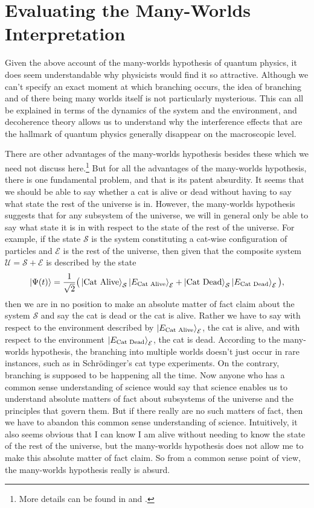  
    
    \section{Evaluating the Many-Worlds Interpretation}\label{manyworldsinterpretation2}
    Given the above account of the many-worlds hypothesis of quantum physics, it does seem understandable why physicists would find it so attractive. Although we can't specify an exact moment at which branching occurs, the idea of branching and of there being many worlds itself is not particularly mysterious. This can all be explained in terms of the dynamics of the system and the environment, and decoherence theory allows us to understand why the interference effects that are the hallmark of quantum physics generally disappear on the macroscopic level. 
    
    There are other advantages  of the many-worlds hypothesis besides these which we need not discuss here.\footnote{More details can be found in \cite{Schlosshauer} and \cite{joos2013decoherence}.} But for all the advantages of the many-worlds hypothesis, there is one fundamental problem, and that is its patent absurdity. It seems that we should be able to say whether a cat is alive or dead without having to say what state the rest of the universe is in. However, the many-worlds hypothesis suggests that for any subsystem of the universe, we will in general only be able to say what state it is in with respect to the state of the rest of the universe. For example, if the state $\mathcal{S}$ is the system constituting a cat-wise configuration of particles and $\mathcal{E}$ is the rest of the universe, then given that the composite system $\mathcal{U}=\mathcal{S}+\mathcal{E}$ is described by the state $$\ket{\Psi(t)}=\frac{1}{\sqrt{2}}\big(\ket{\text{Cat Alive}}_\mathcal{S}\ket{E_\text{Cat Alive}}_\mathcal{E}+\ket{\text{Cat Dead}}_\mathcal{S}\ket{E_\text{Cat Dead}}_\mathcal{E}\big),$$ then we are in no position to make an absolute matter of fact claim about the system $\mathcal{S}$ and say the cat is dead or the cat is alive. Rather we have to say with respect to the environment described by $\ket{E_\text{Cat Alive}}_\mathcal{E}$, the cat is alive, and with respect to the environment $\ket{E_\text{Cat Dead}}_\mathcal{E}$, the cat is dead. According to the many-worlds hypothesis, the branching into multiple worlds doesn't just occur in rare instances, such as in Schr\"{o}dinger's cat type experiments. On the contrary, branching is supposed to be happening all the time.  Now anyone who has a common sense understanding of science would say that science enables us to understand absolute matters of fact about subsystems of the universe and the principles that govern them. But if there really are no such matters of fact, then we have to abandon this common sense understanding of science. Intuitively, it also seems obvious that I can know I am alive without needing to know the state of the rest of the universe, but the many-worlds hypothesis does not allow me to make this absolute matter of fact claim. So from a common sense point of view, the many-worlds hypothesis really is absurd.
    
